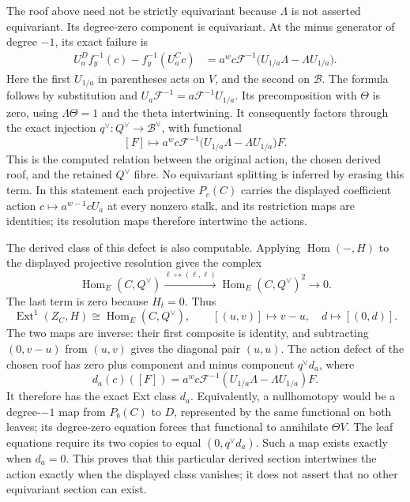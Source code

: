 \documentclass[10pt,a4paper,oneside]{report}
\begin{document}
The roof above need not be strictly equivariant because \(\Lambda\) is
not asserted equivariant. Its degree-zero component is equivariant. At
the minus generator of degree \(-1\), its exact failure is \[
\begin{aligned}
U_a^{D}f_y^{-1}(c)-f_y^{-1}(U_a^{C}c)
&=a^w c\mathcal F^{-1}
\bigl(U_{1/a}\Lambda-\Lambda U_{1/a}\bigr).
\end{aligned}
\] Here the first \(U_{1/a}\) in parentheses acts on \(V\), and the
second on \(\mathscr B\). The formula follows by substitution and
\(U_a\mathcal F^{-1}=a\mathcal F^{-1}U_{1/a}\). Its precomposition with
\(\Theta\) is zero, using \(\Lambda\Theta=1\) and the theta
intertwining. It consequently factors through the exact injection
\(q^\vee:Q^\vee\to\mathscr B^\vee\), with functional \[
[F]\longmapsto a^w c\mathcal F^{-1}
\bigl(U_{1/a}\Lambda-\Lambda U_{1/a}\bigr)F.
\] This is the computed relation between the original action, the chosen
derived roof, and the retained \(Q^\vee\) fibre. No equivariant
splitting is inferred by erasing this term. In this statement each
projective \(P_v(C)\) carries the displayed coefficient action
\(c\mapsto a^{w-1}cU_a\) at every nonzero stalk, and its restriction
maps are identities; its resolution maps therefore intertwine the
actions.

The derived class of this defect is also computable. Applying
\(\operatorname{Hom}(-,H)\) to the displayed projective resolution gives
the complex \[
\operatorname{Hom}_E(C,Q^\vee)
\xrightarrow{\ell\mapsto(\ell,\ell)}
\operatorname{Hom}_E(C,Q^\vee)^2
\longrightarrow0.
\] The last term is zero because \(H_t=0\). Thus \[
\operatorname{Ext}^1(Z_C,H)
\cong\operatorname{Hom}_E(C,Q^\vee),
\qquad[(u,v)]\longmapsto v-u,
\quad
d\longmapsto[(0,d)].
\] The two maps are inverse: their first composite is identity, and
subtracting \((0,v-u)\) from \((u,v)\) gives the diagonal pair
\((u,u)\). The action defect of the chosen roof has zero plus component
and minus component \(q^\vee d_a\), where \[
d_a(c)([F])=
a^w c\mathcal F^{-1}
(U_{1/a}\Lambda-\Lambda U_{1/a})F.
\] It therefore has the exact Ext class \(d_a\). Equivalently, a
nullhomotopy would be a degree-\(-1\) map from \(P_b(C)\) to \(D\),
represented by the same functional on both leaves; its degree-zero
equation forces that functional to annihilate \(\Theta V\). The leaf
equations require its two copies to equal \((0,q^\vee d_a)\). Such a map
exists exactly when \(d_a=0\). This proves that this particular derived
section intertwines the action exactly when the displayed class
vanishes; it does not assert that no other equivariant section can
exist.
\end{document}
